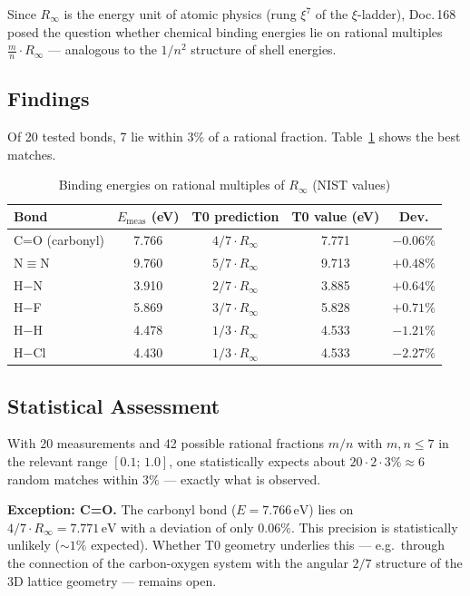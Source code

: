 Since $R_\infty$ is the energy unit of atomic physics (rung $\xi^7$ of the
$\xi$-ladder), Doc.\,168 posed the question whether chemical binding energies
lie on rational multiples $\frac{m}{n} \cdot R_\infty$ — analogous to the
$1/n^2$ structure of shell energies.

\subsection{Findings}
\label{subsec:findings-be}

Of 20 tested bonds, 7 lie within $3\%$ of a rational fraction.
Table~\ref{tab:bonds} shows the best matches.

\begin{table}[htbp]
\centering
\caption{Binding energies on rational multiples of $R_\infty$ (NIST values)}
\label{tab:bonds}
\begin{tabular}{lcccc}
\hline
Bond & $E_\mathrm{meas}$ (eV) & T0 prediction & T0 value (eV) & Dev. \\
\hline
C=O (carbonyl)  & 7.766 & $4/7 \cdot R_\infty$ & 7.771 & $-0.06\%$ \\
N$\equiv$N      & 9.760 & $5/7 \cdot R_\infty$ & 9.713 & $+0.48\%$ \\
H$-$N           & 3.910 & $2/7 \cdot R_\infty$ & 3.885 & $+0.64\%$ \\
H$-$F           & 5.869 & $3/7 \cdot R_\infty$ & 5.828 & $+0.71\%$ \\
H$-$H           & 4.478 & $1/3 \cdot R_\infty$ & 4.533 & $-1.21\%$ \\
H$-$Cl          & 4.430 & $1/3 \cdot R_\infty$ & 4.533 & $-2.27\%$ \\
\hline
\end{tabular}
\end{table}

\subsection{Statistical Assessment}
\label{subsec:statistics-be}

With 20 measurements and 42 possible rational fractions $m/n$ with $m,n \leq 7$
in the relevant range $[0.1;\, 1.0]$, one statistically expects about
$20 \cdot 2 \cdot 3\% \approx 6$ random matches within $3\%$
— exactly what is observed.

\textbf{Exception: C=O.}
The carbonyl bond ($E = 7.766\,\mathrm{eV}$) lies on
$4/7 \cdot R_\infty = 7.771\,\mathrm{eV}$ with a deviation of only $0.06\%$.
This precision is statistically unlikely ($\sim1\%$ expected). Whether
T0 geometry underlies this — e.g.\ through the connection of the
carbon-oxygen system with the angular $2/7$ structure of the 3D lattice
geometry — remains open.

